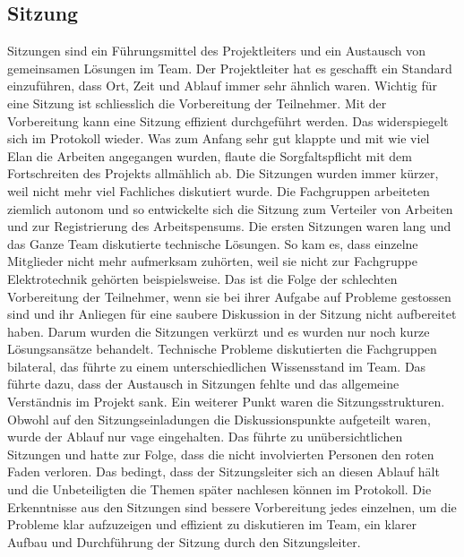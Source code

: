\subsection{Sitzung}
Sitzungen sind ein Führungsmittel des Projektleiters und ein Austausch von gemeinsamen Lösungen im Team. Der Projektleiter hat es geschafft ein Standard einzuführen, dass Ort, Zeit und Ablauf immer sehr ähnlich waren. Wichtig für eine Sitzung ist schliesslich die Vorbereitung der Teilnehmer. Mit der Vorbereitung kann eine Sitzung effizient durchgeführt werden. Das widerspiegelt sich im Protokoll wieder. Was zum Anfang sehr gut klappte und mit wie viel Elan die Arbeiten angegangen wurden, flaute die Sorgfaltspflicht mit dem Fortschreiten des Projekts allmählich ab. Die Sitzungen wurden immer kürzer, weil nicht mehr viel Fachliches diskutiert wurde. Die Fachgruppen arbeiteten ziemlich autonom und so entwickelte sich die Sitzung zum Verteiler von Arbeiten und zur Registrierung des Arbeitspensums. Die ersten Sitzungen waren lang und das Ganze Team diskutierte technische Lösungen. So kam es, dass einzelne Mitglieder nicht mehr aufmerksam zuhörten, weil sie nicht zur Fachgruppe Elektrotechnik gehörten beispielsweise. Das ist die Folge der schlechten Vorbereitung der Teilnehmer, wenn sie bei ihrer Aufgabe auf Probleme gestossen sind und ihr Anliegen für eine saubere Diskussion in der Sitzung nicht aufbereitet haben. Darum wurden die Sitzungen verkürzt und es wurden nur noch kurze Lösungsansätze behandelt. Technische Probleme diskutierten die Fachgruppen bilateral, das führte zu einem unterschiedlichen Wissensstand im Team. Das führte dazu, dass der Austausch in Sitzungen fehlte und das allgemeine Verständnis im Projekt sank. Ein weiterer Punkt waren die Sitzungsstrukturen. Obwohl auf den Sitzungseinladungen die Diskussionspunkte aufgeteilt waren, wurde der Ablauf nur vage eingehalten. Das führte zu unübersichtlichen Sitzungen und hatte zur Folge, dass die nicht involvierten Personen den roten Faden verloren. Das bedingt, dass der Sitzungsleiter sich an diesen Ablauf hält und die Unbeteiligten die Themen später nachlesen können im Protokoll.
Die Erkenntnisse aus den Sitzungen sind bessere Vorbereitung jedes einzelnen, um die Probleme klar aufzuzeigen und effizient zu diskutieren im Team, ein klarer Aufbau und Durchführung der Sitzung durch den Sitzungsleiter.
